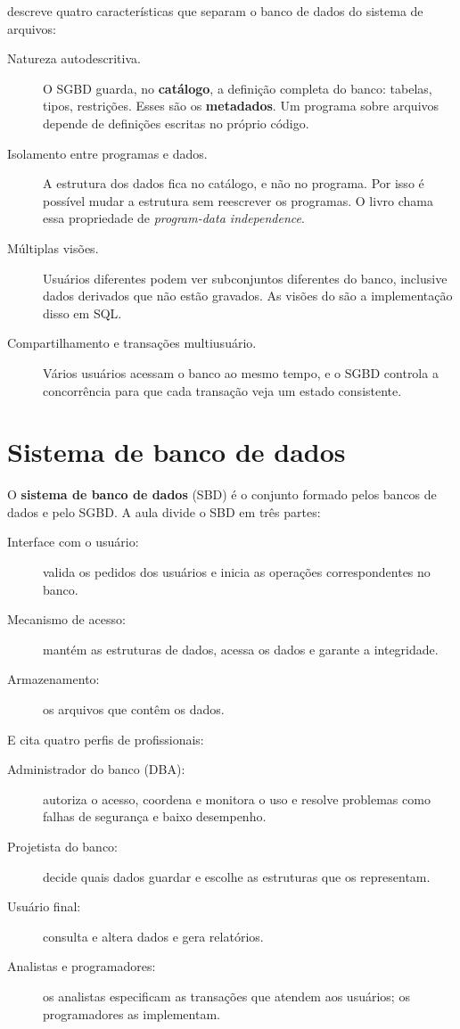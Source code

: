 \textcite[seção 1.3]{Elmasri2011} descreve quatro características que
separam o banco de dados do sistema de arquivos:

\begin{description}
	\item[Natureza autodescritiva.] O SGBD guarda, no
	\textbf{catálogo}, a definição completa do banco:
	tabelas, tipos, restrições. Esses são os \textbf{metadados}. Um
	programa sobre arquivos depende de definições escritas no próprio
	código.
	\item[Isolamento entre programas e dados.] A estrutura dos dados fica
	no catálogo, e não no programa. Por isso é possível mudar a estrutura
	sem reescrever os programas. O livro chama essa propriedade de
	\emph{program-data independence}.
	\item[Múltiplas visões.] Usuários diferentes podem ver subconjuntos
	diferentes do banco, inclusive dados derivados que não estão gravados.
	As visões do  são a implementação disso em SQL.
	\item[Compartilhamento e transações multiusuário.] Vários usuários
	acessam o banco ao mesmo tempo, e o SGBD controla a concorrência para
	que cada transação veja um estado consistente.
\end{description}

\section{Sistema de banco de dados}

O \textbf{sistema de banco de dados}
(SBD) é o conjunto formado pelos bancos de dados e pelo SGBD. A aula
divide o SBD em três partes:

\begin{description}
	\item[Interface com o usuário:] valida os pedidos dos usuários e
	inicia as operações correspondentes no banco.
	\item[Mecanismo de acesso:] mantém as estruturas de dados, acessa os
	dados e garante a integridade.
	\item[Armazenamento:] os arquivos que contêm os dados.
\end{description}

E cita quatro perfis de profissionais:

\begin{description}
	\item[Administrador do banco (DBA):] autoriza o acesso, coordena e
	monitora o uso e resolve problemas como falhas de segurança e baixo
	desempenho.
	\item[Projetista do banco:] decide quais dados guardar e escolhe as
	estruturas que os representam.
	\item[Usuário final:] consulta e altera dados e gera relatórios.
	\item[Analistas e programadores:] os analistas especificam as
	transações que atendem aos usuários; os programadores as implementam.
\end{description}


